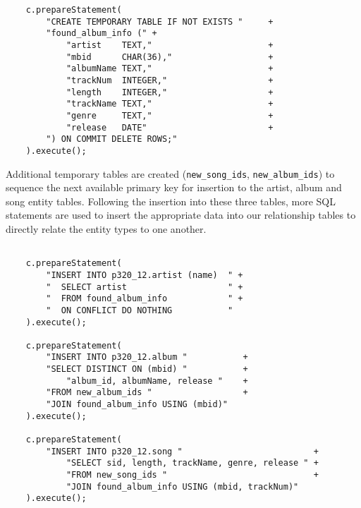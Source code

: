 \documentclass[12pt]{article}
\begin{document}
    \begin{lstlisting}
    c.prepareStatement(
        "CREATE TEMPORARY TABLE IF NOT EXISTS "     +
        "found_album_info (" +
            "artist    TEXT,"                       +
            "mbid      CHAR(36),"                   +
            "albumName TEXT,"                       +
            "trackNum  INTEGER,"                    +
            "length    INTEGER,"                    +
            "trackName TEXT,"                       +
            "genre     TEXT,"                       +
            "release   DATE"                        +
        ") ON COMMIT DELETE ROWS;"
    ).execute();

    \end{lstlisting}

    \noindent Additional temporary tables are created (\lstinline{new_song_ids},
    \lstinline{new_album_ids}) to sequence the next available
    primary key for insertion to the artist, album and song entity
    tables. Following the insertion into these three tables, more SQL
    statements are used to insert the appropriate data into our relationship
    tables to directly relate the entity types to one another.

    \begin{lstlisting}

    c.prepareStatement(
        "INSERT INTO p320_12.artist (name)  " +
        "  SELECT artist                    " +
        "  FROM found_album_info            " +
        "  ON CONFLICT DO NOTHING           "
    ).execute();

    c.prepareStatement(
        "INSERT INTO p320_12.album "           +
        "SELECT DISTINCT ON (mbid) "           +
            "album_id, albumName, release "    +
        "FROM new_album_ids "                  +
        "JOIN found_album_info USING (mbid)"
    ).execute();

    c.prepareStatement(
        "INSERT INTO p320_12.song "                          +
            "SELECT sid, length, trackName, genre, release " +
            "FROM new_song_ids "                             +
            "JOIN found_album_info USING (mbid, trackNum)"
    ).execute();
    \end{lstlisting}

    
\end{document}

